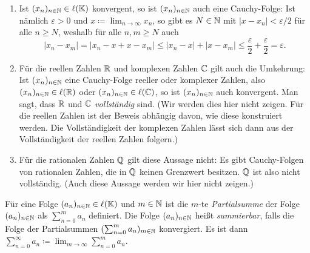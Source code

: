 \begin{bem}
 \begin{enumerate}[leftmargin=*]
  \item
   Ist $(x_n)_{n \in \mathbb{N}} \in \ell(\mathbb{K})$ konvergent, so ist $(x_n)_{n \in \mathbb{N}}$ auch eine Cauchy-Folge: Ist nämlich $\varepsilon > 0$ und $x \coloneqq \lim_{n \to \infty} x_n$, so gibt es $N \in \mathbb{N}$ mit $|x - x_n| < \varepsilon/2$ für alle $n \geq N$, weshalb für alle $n,m \geq N$ auch
   \[
    |x_n - x_m|
    = |x_n - x + x - x_m|
    \leq |x_n - x| + |x - x_m|
    \leq \frac{\varepsilon}{2} + \frac{\varepsilon}{2}
    = \varepsilon.
   \]
  \item
   Für die reellen Zahlen $\mathbb{R}$ und komplexen Zahlen $\mathbb{C}$ gilt auch die Umkehrung: Ist $(x_n)_{n \in \mathbb{N}}$ eine Cauchy-Folge reeller oder komplexer Zahlen, also $(x_n)_{n \in \mathbb{N}} \in \ell(\mathbb{R})$ oder $(x_n)_{n \in \mathbb{N}} \in \ell(\mathbb{C})$, so ist $(x_n)_{n \in \mathbb{N}}$ auch konvergent. Man sagt, dass $\mathbb{R}$ und $\mathbb{C}$ \emph{vollständig} sind. (Wir werden dies hier nicht zeigen. Für die reellen Zahlen ist der Beweis abhängig davon, wie diese konstruiert werden. Die Vollständigkeit der komplexen Zahlen lässt sich dann aus der Vollständigkeit der reellen Zahlen folgern.)
  \item
   Für die rationalen Zahlen $\mathbb{Q}$ gilt diese Aussage nicht: Es gibt Cauchy-Folgen von rationalen Zahlen, die in $\mathbb{Q}$ keinen Grenzwert besitzen. $\mathbb{Q}$ ist also nicht vollständig. (Auch diese Aussage werden wir hier nicht zeigen.)
 \end{enumerate}
\end{bem}


\begin{defi}
 Für eine Folge $(a_n)_{n \in \mathbb{N}} \in \ell(\mathbb{K})$ und $m \in \mathbb{N}$ ist die $m$-te \emph{Partialsumme} der Folge $(a_n)_{n \in \mathbb{N}}$ als $\sum_{n=0}^m a_n$ definiert. Die Folge $(a_n)_{n \in \mathbb{N}}$ heißt \emph{summierbar}, falls die Folge der Partialsummen $(\sum_{n=0}^m a_n)_{m \in \mathbb{N}}$ konvergiert. Es ist dann $\sum_{n=0}^\infty a_n \coloneqq \lim_{m \to \infty} \sum_{n=0}^m a_n$.
\end{defi}


